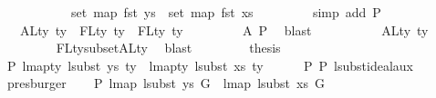 \begin{isabellebody}
\ \ \ \ \ \ \ \ \ \ \ set\ {\isacharparenleft}{\kern0pt}map\ fst\ ys{}{\isacharparenright}{\kern0pt}\ {\isasymunion}\ set\ {\isacharparenleft}{\kern0pt}map\ fst\ xs{\isacharparenright}{\kern0pt}{\isachardoublequoteclose}\isanewline
\ \ \ \ \ \ \ \isamarkupfalse%
\ {\isacharparenleft}{\kern0pt}simp\ add{\isacharcolon}{\kern0pt}\ P{}{\isacharparenright}{\kern0pt}\isanewline
\ \ \ \ \ \isamarkupfalse%
\ \isamarkupfalse%
\ {\isachardoublequoteopen}{\isachardot}{\kern0pt}{\isachardot}{\kern0pt}{\isachardot}{\kern0pt}\ {\isacharequal}{\kern0pt}\ {\isacharparenleft}{\kern0pt}ALty\ ty\ {\isacharminus}{\kern0pt}\ FLty\ ty{\isacharparenright}{\kern0pt}\ {\isasymunion}\ FLty\ ty{\isachardoublequoteclose}\isanewline
\ \ \ \ \ \ \ \isamarkupfalse%
\ A{}\ P{}\ \isamarkupfalse%
\ blast\isanewline
\ \ \ \ \ \isamarkupfalse%
\ \isamarkupfalse%
\ {\isachardoublequoteopen}{\isachardot}{\kern0pt}{\isachardot}{\kern0pt}{\isachardot}{\kern0pt}\ {\isacharequal}{\kern0pt}\ ALty\ ty{\isachardoublequoteclose}\isanewline
\ \ \ \ \ \ \ \isamarkupfalse%
\ FLty{\isacharunderscore}{\kern0pt}subset{\isacharunderscore}{\kern0pt}ALty\ \isamarkupfalse%
\ blast\isanewline
\ \ \ \ \ \isamarkupfalse%
\ \isamarkupfalse%
\ {\isacharquery}{\kern0pt}thesis\ \isakeywordONE{{\isachardot}{\kern0pt}}\isamarkupfalse%
\isanewline
\ \ \ \isamarkupfalse%
\isanewline
\isanewline
\ \ \isamarkupfalse%
\ P{}{\isacharcolon}{\kern0pt}\ {\isachardoublequoteopen}lmap{\isacharunderscore}{\kern0pt}ty\ {\isacharparenleft}{\kern0pt}lsubst\ ys{\isacharparenright}{\kern0pt}\ ty\ {\isacharequal}{\kern0pt}\ lmap{\isacharunderscore}{\kern0pt}ty\ {\isacharparenleft}{\kern0pt}lsubst\ xs{\isacharparenright}{\kern0pt}\ ty{\isachardoublequoteclose}\isanewline
\ \ \ \ \isamarkupfalse%
\ P{}\ P{}\ lsubst{\isacharunderscore}{\kern0pt}ideal{\isacharunderscore}{\kern0pt}aux\ \isamarkupfalse%
\ presburger\isanewline
\ \ \isamarkupfalse%
\ P{}{\isacharcolon}{\kern0pt}\ {\isachardoublequoteopen}lmap\ {\isacharparenleft}{\kern0pt}lsubst\ ys{\isacharparenright}{\kern0pt}\ G\ {\isacharequal}{\kern0pt}\ lmap\ {\isacharparenleft}{\kern0pt}lsubst\ xs{\isacharparenright}{\kern0pt}\ G{\isachardoublequoteclose}\isanewline
\ \ \ \ \isamarkupfalse%

\end{isabellebody}
